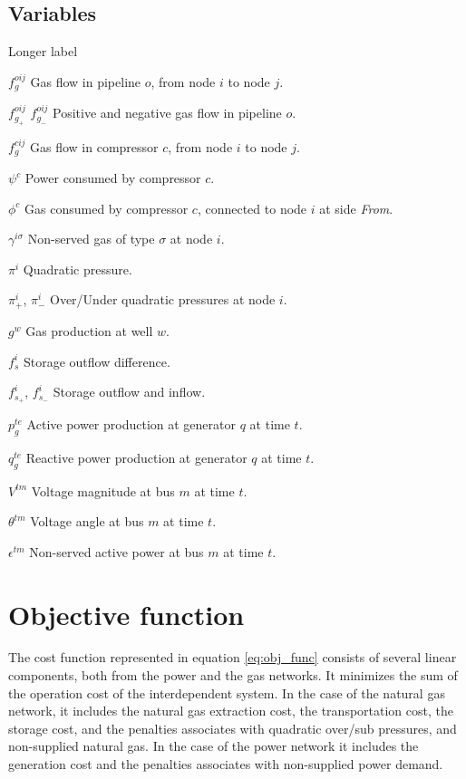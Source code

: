 \subsection*{Variables}

\begin{labeling}{Longer label\quad}
\item [${f}_{g}^{oij}$] Gas flow in pipeline $o$, from node $i$ to node $j$.
\item [${f}_{g_+}^{oij}$ ${f}_{g_-}^{oij}$] Positive and negative gas flow in pipeline $o$.
\item [${f}_{g}^{cij}$] Gas flow in compressor $c$, from node $i$ to node $j$.
\item [$\psi^{c}$] Power consumed by compressor $c$.
\item [$\phi^{c}$] Gas consumed by compressor $c$, connected to node $i$ at side \textit{From}.
\item [$\gamma^{i \sigma}$] Non-served gas of type $\sigma$ at node $i$.
\item [$\pi^{i}$] Quadratic pressure.
\item [${\pi}^{i}_{+}$, ${\pi}^{i}_{-}$] Over/Under quadratic pressures at node $i$.
\item [$g^{w}$] Gas production at well $w$.
\item [$f_{s}^{i}$] Storage outflow difference.
\item [$f_{s_+}^{i}$, $f_{s_-}^{i}$] Storage outflow and inflow.
\item [$p_{g}^{te}$] Active power production at generator $q$ at time $t$.
\item [$q_{g}^{te}$] Reactive power production at generator $q$ at time $t$.
\item [$V^{tm}$] Voltage magnitude at bus $m$ at time $t$.
\item [$\theta^{tm}$] Voltage angle at bus $m$ at time $t$.
\item [$\epsilon^{tm}$] Non-served active power at bus $m$ at time $t$.
\end{labeling}
\section{Objective function}

The cost function represented in equation \ref{eq:obj_func} consists of several linear components, both from the power and the gas networks. It minimizes the sum of the operation cost  of the interdependent system. In the case of the natural gas network, it includes the natural gas extraction cost, the transportation cost, the storage cost, and the penalties associates with quadratic  over/sub pressures, and non-supplied natural gas. In the case of the power network it includes the generation cost and the penalties associates with non-supplied power demand.

